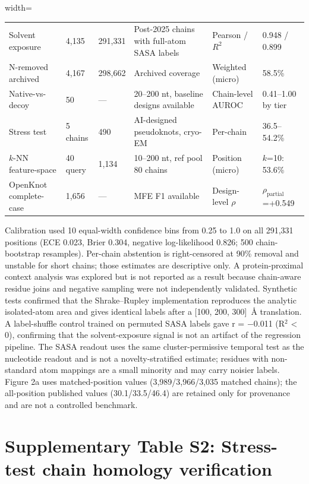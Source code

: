 \documentclass[pdflatex,sn-nature]{sn-jnl}
\begin{document}
\begin{adjustbox}{width=\textwidth}
\begin{tabular}{p{}p{}p{}p{}p{}p{}}
Solvent exposure & 4,135 & 291,331 & Post-2025 chains with full-atom SASA labels & Pearson / $R^2$ & 0.948 / 0.899 \\
N-removed archived & 4,167 & 298,662 & Archived coverage & Weighted (micro) & 58.5\% \\
Native-vs-decoy & 50 & --- & 20--200 nt, baseline designs available & Chain-level AUROC & 0.41--1.00 by tier \\
Stress test & 5 chains & 490 & AI-designed pseudoknots, cryo-EM & Per-chain & 36.5--54.2\% \\
$k$-NN feature-space & 40 query & 1,134 & 10--200 nt, ref pool 80 chains & Position (micro) & $k$=10: 53.6\% \\
OpenKnot complete-case & 1,656 & --- & MFE F1 available & Design-level $\rho$ & $\rho_{\mathrm{partial}}$=+0.549 \\
\bottomrule
\end{tabular}
\end{adjustbox}
\endgroup

Calibration used 10 equal-width confidence bins from 0.25 to 1.0 on all 291,331
positions (ECE 0.023, Brier 0.304, negative log-likelihood 0.826; 500 chain-bootstrap
resamples). Per-chain abstention is right-censored at 90\% removal and unstable for
short chains; those estimates are descriptive only. A protein-proximal context analysis
was explored but is not reported as a result because chain-aware residue joins and
negative sampling were not independently validated. Synthetic tests confirmed that the Shrake--Rupley implementation reproduces the analytic
isolated-atom area and gives identical labels after a [100, 200, 300]~\AA{} translation.
A label-shuffle control trained on permuted SASA labels gave r = $-$0.011 (R$^2$ < 0),
confirming that the solvent-exposure signal is not an artifact of the regression pipeline.
The SASA readout uses the same cluster-permissive temporal test as the nucleotide readout
and is not a novelty-stratified estimate; residues with non-standard atom mappings are a
small minority and may carry noisier labels. Figure 2a uses matched-position
values (3,989/3,966/3,035 matched chains); the all-position published values
(30.1/33.5/46.4) are retained only for provenance and are not a controlled benchmark.

\section*{Supplementary Table S2: Stress-test chain homology verification}
\end{document}
